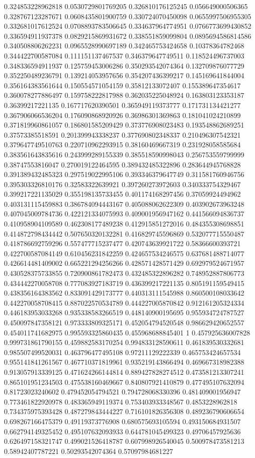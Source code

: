 \begin{table}
\begin{tabu}
\begin{sparkline}{10}
0.324853228962818 0.0530729801769205 0.326810176125245 0.056649000506365 0.328767123287671 0.0608435801900759 0.330724070450098 0.0655997506955305 0.332681017612524 0.0708893783506645 0.334637964774951 0.0766773699430852 0.336594911937378 0.0829215869931672 0.338551859099804 0.0895694586814586 0.340508806262231 0.0965528990697189 0.342465753424658 0.10378364782468 0.344422700587084 0.111151137467537 0.346379647749511 0.118524496737003 0.348336594911937 0.125759453006286 0.350293542074364 0.132709876077729 0.352250489236791 0.139214053957656 0.354207436399217 0.145169641844004 0.356164383561644 0.150554571054159 0.35812133072407 0.155389647354617 0.360078277886497 0.159758222817988 0.362035225048924 0.163803123353187 0.36399217221135 0.167717620390501 0.365949119373777 0.171731134421277 0.367906066536204 0.176090868920926 0.36986301369863 0.181041024210899 0.371819960861057 0.186801585209429 0.373776908023483 0.193548862689251 0.37573385518591 0.201399943338237 0.377690802348337 0.210496307542321 0.379647749510763 0.220710962293915 0.38160469667319 0.231928058585684 0.383561643835616 0.243999289155339 0.385518590998043 0.256753559799999 0.38747553816047 0.270019122464595 0.389432485322896 0.283644945768828 0.391389432485323 0.297519022995106 0.393346379647749 0.311581760946756 0.395303326810176 0.32583322639921 0.397260273972603 0.340333754329467 0.399217221135029 0.355198135733455 0.401174168297456 0.37059924494962 0.403131115459883 0.386784094443167 0.405088062622309 0.403902673963248 0.407045009784736 0.422121334075993 0.409001956947162 0.441566094836737 0.410958904109589 0.462308177489238 0.412915851272016 0.484355308698851 0.414872798434442 0.507650320132281 0.416829745596869 0.532077715550487 0.418786692759296 0.557477715237477 0.420743639921722 0.58366600393721 0.422700587084149 0.610456231842259 0.424657534246575 0.637681488714077 0.426614481409002 0.665221294256266 0.428571428571429 0.692979524671957 0.430528375733855 0.720900861782473 0.432485322896282 0.748952887806773 0.434442270058708 0.777083927183719 0.436399217221135 0.805191159549415 0.438356164383562 0.833091429173777 0.440313111545988 0.860500108033642 0.442270058708415 0.887022570534789 0.444227005870842 0.912161205324334 0.446183953033268 0.935338583266519 0.448140900195695 0.955934724787527 0.450097847358121 0.973333809325171 0.452054794520548 0.986629420652557 0.454011741682975 0.995593325860435 0.455968688845401 1 0.457925636007828 0.999731861790155 0.459882583170254 0.994833128590611 0.461839530332681 0.985507499520031 0.463796477495108 0.97211129222339 0.465753424657534 0.955141841261567 0.467710371819961 0.935219143866494 0.469667318982388 0.913057913339125 0.471624266144814 0.889427828274512 0.473581213307241 0.865101951234503 0.475538160469667 0.840807921410879 0.477495107632094 0.81723023240602 0.479452054794521 0.794728068330396 0.481409001956947 0.773461822920978 0.483365949119374 0.753403933348567 0.4853228962818 0.734375975393428 0.487279843444227 0.716101826356308 0.489236790606654 0.698267166475379 0.49119373776908 0.680575693105594 0.493150684931507 0.662794149325452 0.495107632093933 0.644781045499323 0.49706457925636 0.626497158321747 0.499021526418787 0.607998926540045 0.500978473581213 0.58942407787221 0.50293542074364 0.57097984681227 
\end{sparkline}
\end{tabu}
\end{table}

